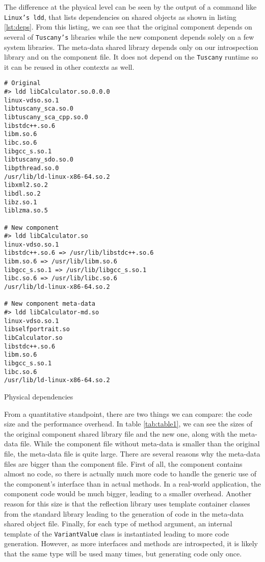 The difference at the physical level can be seen by the output of a command like \texttt{Linux's ldd}, that lists
dependencies on shared objects as shown in listing \ref{lst:deps}. From this listing, we can see that the original
component depends on several of \texttt{Tuscany's} libraries while the new component depends solely on a few system
libraries. The meta-data shared library depends only on our introspection library and on the component file. It does
not depend on the \texttt{Tuscany} runtime so it can be reused in other contexts as well.


\begin{listing}
\begin{verbatim}
# Original
#> ldd libCalculator.so.0.0.0 
linux-vdso.so.1
libtuscany_sca.so.0
libtuscany_sca_cpp.so.0
libstdc++.so.6
libm.so.6
libc.so.6
libgcc_s.so.1
libtuscany_sdo.so.0
libpthread.so.0
/usr/lib/ld-linux-x86-64.so.2
libxml2.so.2
libdl.so.2
libz.so.1
liblzma.so.5

# New component
#> ldd libCalculator.so 
linux-vdso.so.1
libstdc++.so.6 => /usr/lib/libstdc++.so.6
libm.so.6 => /usr/lib/libm.so.6
libgcc_s.so.1 => /usr/lib/libgcc_s.so.1
libc.so.6 => /usr/lib/libc.so.6
/usr/lib/ld-linux-x86-64.so.2

# New component meta-data
#> ldd libCalculator-md.so 
linux-vdso.so.1
libselfportrait.so
libCalculator.so
libstdc++.so.6
libm.so.6
libgcc_s.so.1
libc.so.6
/usr/lib/ld-linux-x86-64.so.2
 \end{verbatim}
\caption{Physical dependencies}
\label{lst:deps}
\end{listing}

From a quantitative standpoint, there are two things we can compare: the code size and the performance overhead.
In table \ref{tab:table1}, we can see the sizes of the original component shared library file and the new one,
along with the meta-data file. While the component file without meta-data is smaller than the original file,
the meta-data file is quite large. There are several reasons why the meta-data files are bigger than the component
file. First of all, the component contains almost no code, so there is actually much more code to handle the
generic use of the component's interface than in actual methods. In a real-world application, the component code
would be much bigger, leading to a smaller overhead. Another reason for this size is that the reflection library
uses template container classes from the standard library leading to the generation of code in the meta-data shared
object file. Finally, for each type of method argument, an internal template of the \texttt{VariantValue} class
is instantiated leading to more code generation. However, as more interfaces and methods are introspected, it is
likely that the same type will be used many times, but generating code only once.

